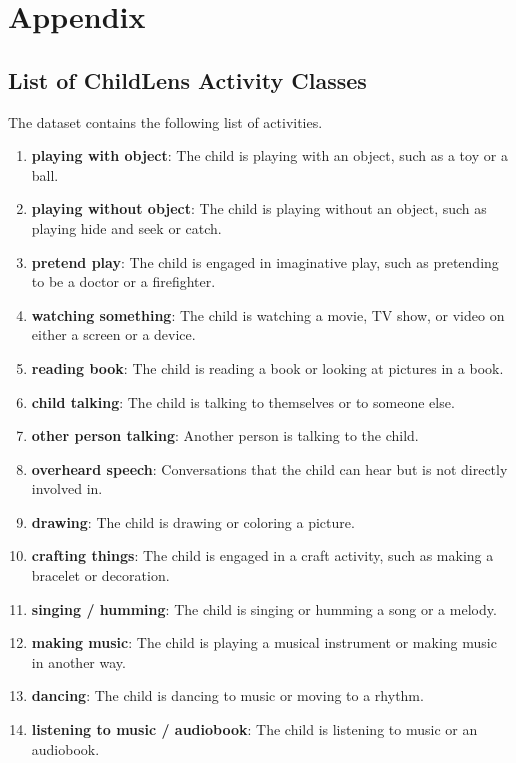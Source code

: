 \documentclass[
  man,floatsintext]{apa6}
\providecommand{\tightlist}{%
  \setlength{\itemsep}{0pt}\setlength{\parskip}{0pt}}
\begin{document}
\endgroup

\newpage

\section{Appendix}\label{appendix}

\subsection{List of ChildLens Activity Classes}\label{list-of-childlens-activity-classes}

The dataset contains the following list of activities.

\begin{enumerate}
\def\labelenumi{\arabic{enumi}.}
\tightlist
\item
  \textbf{playing with object}: The child is playing with an object, such as a toy or a ball.
\item
  \textbf{playing without object}: The child is playing without an object, such as playing hide and seek or catch.
\item
  \textbf{pretend play}: The child is engaged in imaginative play, such as pretending to be a doctor or a firefighter.
\item
  \textbf{watching something}: The child is watching a movie, TV show, or video on either a screen or a device.
\item
  \textbf{reading book}: The child is reading a book or looking at pictures in a book.
\item
  \textbf{child talking}: The child is talking to themselves or to someone else.
\item
  \textbf{other person talking}: Another person is talking to the child.
\item
  \textbf{overheard speech}: Conversations that the child can hear but is not directly involved in.
\item
  \textbf{drawing}: The child is drawing or coloring a picture.
\item
  \textbf{crafting things}: The child is engaged in a craft activity, such as making a bracelet or decoration.
\item
  \textbf{singing / humming}: The child is singing or humming a song or a melody.
\item
  \textbf{making music}: The child is playing a musical instrument or making music in another way.
\item
  \textbf{dancing}: The child is dancing to music or moving to a rhythm.
\item
  \textbf{listening to music / audiobook}: The child is listening to music or an audiobook.
\end{enumerate}
\end{document}
